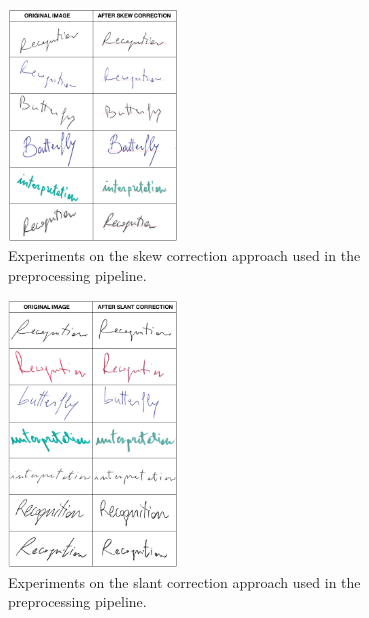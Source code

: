 \documentclass[conference]{IEEEtran}
\begin{document}
\begin{figure}
 \centering
\includegraphics[width=0.4\textwidth]{skew_images.png}
\caption{Experiments on the skew correction approach used in the preprocessing pipeline.}
\label{fig:skew}
\end{figure}

\begin{figure}
 \centering
\includegraphics[width=0.4\textwidth]{slant_images.png}
\caption{Experiments on the slant correction approach used in the preprocessing pipeline.}
\label{fig:slant}
\end{figure}
\end{document}
